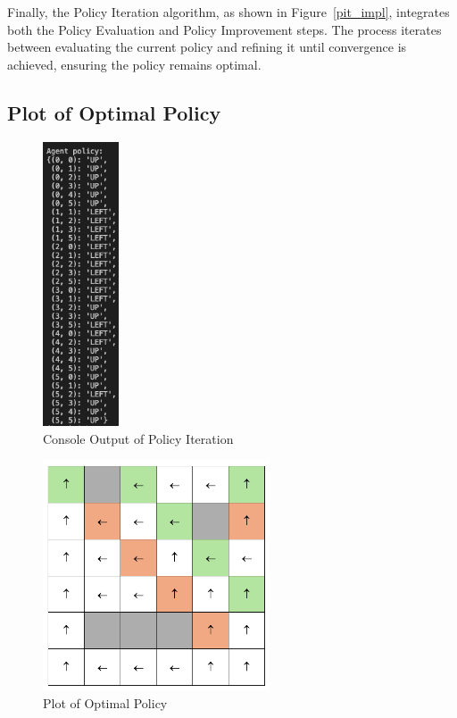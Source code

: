 \noindent Finally, the Policy Iteration algorithm, as shown in Figure~\ref{pit_impl}, integrates both the Policy Evaluation and Policy Improvement steps. The process iterates between evaluating the current policy and refining it until convergence is achieved, ensuring the policy remains optimal.

\subsection{Plot of Optimal Policy}
\begin{figure}[H]
    \centering
    \includegraphics[width=0.2\textwidth]{images/pi_policy.png}
    \caption{Console Output of Policy Iteration}
    \label{pit_plot_policy}
\end{figure}

\begin{figure}[H]
    \centering
    \includegraphics[width=0.6\textwidth]{images/vi_plot_policy.png}
    \caption{Plot of Optimal Policy}
    \label{pit_plot_policy_console}
\end{figure}

